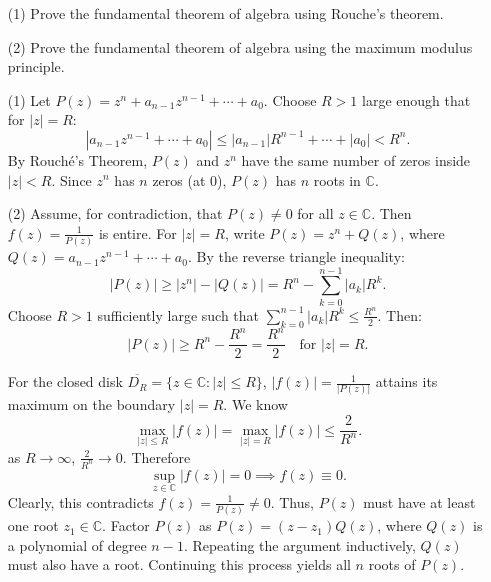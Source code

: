 \documentclass[12pt]{article}
\begin{document}
\begin{statement}[8]
  \begin{itemize}
    \item[(1)] Prove the fundamental theorem of algebra using Rouche's theorem.
    \item[(2)] Prove the fundamental theorem of algebra using the maximum modulus principle.
  \end{itemize}
\end{statement}
\begin{newproof}
    \begin{itemize}
        \item[(1)] Let $P(z) = z^n + a_{n-1}z^{n-1} + \cdots + a_0$. Choose $R > 1$ large enough that   for $|z| = R$:
            $$|a_{n-1}z^{n-1} + \cdots + a_0| \leq |a_{n-1}|R^{n-1} + \cdots + |a_0| < R^n.$$
            By Rouché's Theorem, $P(z)$ and $z^n$ have the same number of zeros inside $|z| < R$. Since $z^n$ has $n$ zeros (at 0), $P(z)$ has $n$ roots in $\mathbb{C}$.
        \item[(2)] Assume, for contradiction, that $ P(z) \neq 0 $ for all $ z \in \mathbb{C} $. Then $ f(z) = \frac{1}{P(z)} $ is entire. For $ |z| = R $, write $ P(z) = z^n + Q(z) $, where $ Q(z) = a_{n-1}z^{n-1} + \cdots + a_0 $. By the reverse triangle inequality:
        $$ |P(z)| \geq |z^n| - |Q(z)| = R^n - \sum_{k=0}^{n-1} |a_k| R^k. $$
        Choose $ R > 1 $ sufficiently large such that $\sum_{k=0}^{n-1} |a_k| R^k \leq \frac{R^n}{2}$. Then:
        $$ |P(z)| \geq R^n - \frac{R^n}{2} = \frac{R^n}{2} \quad \text{for } |z| = R. $$
        \par For the closed disk $ \overline{D_R} = \{z \in \mathbb{C} : |z| \leq R\} $, $ |f(z)| = \frac{1}{|P(z)|} $ attains its maximum on the boundary $ |z| = R $. We know 
        $$ \max_{|z| \leq R} |f(z)| = \max_{|z| = R} |f(z)| \leq \frac{2}{R^n}. $$
        as $ R \to \infty $, $ \frac{2}{R^n} \to 0 $. Therefore
        $$ \sup_{z \in \mathbb{C}} |f(z)| = 0 \implies f(z) \equiv 0. $$
    Clearly, this contradicts $ f(z) = \frac{1}{P(z)} \neq 0 $. Thus, $ P(z) $ must have at least one root $ z_1 \in \mathbb{C} $.
    Factor $ P(z) $ as $ P(z) = (z - z_1)Q(z) $, where $ Q(z) $ is a polynomial of degree $ n-1 $. Repeating the argument inductively, $ Q(z) $ must also have a root. Continuing this process yields all $ n $ roots of $ P(z) $.
    \end{itemize}
\end{newproof}

\end{document}
